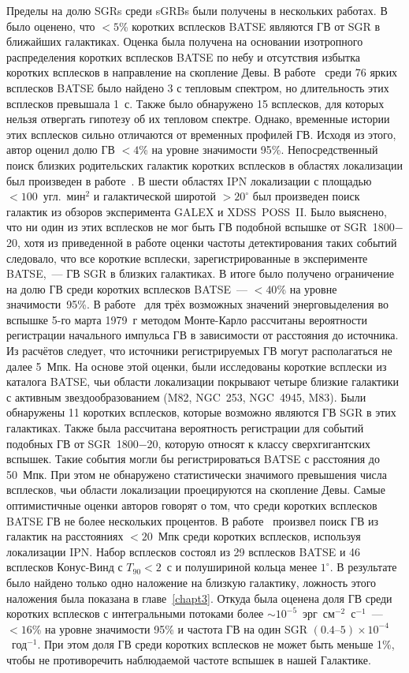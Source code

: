 Пределы на долю SGRs среди sGRBs были получены в нескольких работах. 
В~\citep{Palmer2005} было оценено, что $<5$\% коротких всплесков BATSE являются ГВ 
от SGR в ближайших галактиках. Оценка была получена на основании изотропного распределения коротких 
всплесков BATSE по небу и отсутствия избытка коротких всплесков в направление на скопление Девы.
В работе~\citep{Lazzati2005} среди 76 ярких всплесков BATSE было найдено 3 с тепловым 
спектром, но длительность этих всплесков превышала 1~с. Также было обнаружено 
15 всплесков, для которых нельзя отвергать гипотезу об их тепловом спектре. 
Однако, временные истории этих всплесков сильно отличаются от временных профилей ГВ. 
Исходя из этого, автор оценил долю ГВ $<4$\% на уровне значимости 95\%.
Непосредственный поиск  близких родительских галактик коротких всплесков в 
областях локализации был произведен в работе~\citep{Nakar2006ApJ}. В шести областях IPN 
локализации с площадью $<100$~угл.~мин$^2$ и галактической широтой $>20^{\circ}$ 
был произведен поиск галактик из обзоров эксперимента GALEX и XDSS~POSS~II. 
Было выяснено, что ни один из этих всплесков не мог быть ГВ подобной вспышке 
от SGR~1800$-$20, хотя из приведенной в работе оценки частоты детектирования таких 
событий следовало, что все короткие всплески, зарегистрированные в эксперименте 
BATSE,~--- ГВ SGR в близких галактиках. В итоге было получено ограничение на долю 
ГВ среди коротких всплесков BATSE~--- $<40$\% на уровне значимости~95\%.
В работе~\citep{Popov2006} для трёх возможных значений энерговыделения во вспышке 
5-го марта 1979~г  методом Монте-Карло рассчитаны вероятности регистрации начального 
импульса ГВ в зависимости от расстояния до источника. Из расчётов следует, 
что источники регистрируемых ГВ могут располагаться не далее 5~Мпк. На основе этой оценки, 
были исследованы короткие всплески из каталога BATSE, чьи области локализации 
покрывают четыре близкие галактики с активным звездообразованием (M82, NGC~253, NGC~4945, M83). 
Были обнаружены 11 коротких всплесков, которые возможно являются ГВ SGR в этих галактиках. 
Также была рассчитана вероятность регистрации для событий подобных ГВ от SGR~1800$-$20, 
которую относят к классу сверхгигантских вспышек. Такие события могли бы 
регистрироваться BATSE с расстояния до 50~Мпк. При этом не обнаружено статистически 
значимого превышения числа всплесков, чьи области локализации проецируются на скопление Девы. 
Самые оптимистичные оценки авторов говорят о том, что среди коротких всплесков 
BATSE ГВ не более нескольких процентов.
В работе~\citep{Ofek2007} произвел поиск ГВ из галактик на расстояниях $<20$~Мпк 
среди коротких всплесков, используя локализации IPN. Набор всплесков состоял из 
29 всплесков BATSE и 46 всплесков Конус-Винд с $T_{90}<2$~с и полушириной кольца 
менее $1^{\circ}$. В результате было найдено только одно наложение на близкую 
галактику, ложность этого наложения была показана в главе~\ref{chapt3}. 
Откуда была оценена доля ГВ среди коротких всплесков с интегральными потоками 
более $\sim 10^{-5}$~эрг~см$^{-2}$~с$^{-1}$~--- $<16$\% на уровне значимости 95\% и частота ГВ 
на один SGR $(0.4\textrm{--}5)\times 10^{-4}$~год$^{-1}$. При этом доля ГВ среди 
коротких всплесков не может быть меньше 1\%, чтобы не противоречить наблюдаемой 
частоте вспышек в нашей Галактике. 

